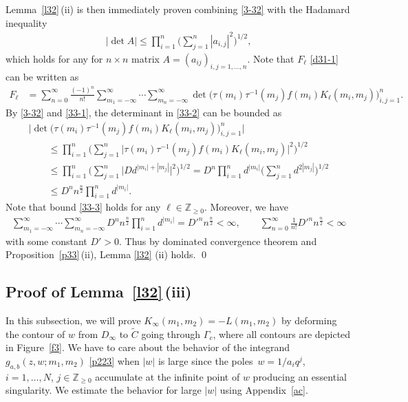 \documentclass[pdftex]{sigma}
\numberwithin{equation}{section}
\def\i{\infty}
\def\t{\tau}
\def\Z{\mathbb{Z}}
\begin{document}
 Lemma~\ref{l32}\,(ii) is then immediately proven
 combining \eqref{3-32} with
 the Hadamard inequality
\begin{align}
\label{33-1}
 |\det A|\le
 \prod_{i=1}^n\Bigg(\sum_{j=1}^n|a_{i,j}|^2\Bigg)^{1/2},
\end{align}
which holds for any for $n\times n$ matrix $A=(a_{ij})_{i,j=1,\dots,n}$.
 Note that $F_\ell$ \eqref{d31-1} can be written as
\begin{align}
 F_{\ell}
\label{33-2}
 &=\sum_{n=0}^{\i}\frac{(-1)^n}{n!}
 \sum_{m_1=-\i}^{\i}\cdots\sum_{m_n=-\i}^{\i}
 \det\big(\t(m_i)\t^{-1}(m_j)f(m_i)K_\ell (m_i,m_j)\big)_{i,j=1}^n.
\end{align}
 By \eqref{3-32} and \eqref{33-1},
 the determinant in \eqref{33-2} can be bounded as
\begin{gather}
 \big|\det\big(\t(m_i)\t^{-1}(m_j)f(m_i)K_\ell (m_i,m_j)\big)_{i,j=1}^n \big|
 \nonumber\\
 \qquad \le
 \prod_{i=1}^n\Bigg(\sum_{j=1}^n \big|\t(m_i)\t^{-1}(m_j)f(m_i)K_\ell (m_i,m_j)\big|^2
 \Bigg)^{1/2}
 \nonumber\\
 \qquad\le
 \prod_{i=1}^n\Bigg(\sum_{j=1}^n \big|Dd^{|m_i|+|m_j|}\big|^2
 \Bigg)^{1/2}
 =D^n \prod_{i=1}^n d^{|m_i|}\Bigg(\sum_{j=1}^n d^{2|m_j|}\Bigg)^{1/2}\nonumber\\
 \qquad \le D^n n^{\frac{n}{2}}\prod_{i=1}^n d^{|m_i|}.\label{33-3}
\end{gather}
 Note that bound \eqref{33-3} holds for any $\ell\in\Z_{\ge 0}$. Moreover, we have
\begin{gather*}
 \sum_{m_1=-\i}^{\i}\cdots\sum_{m_n=-\i}^{\i}
 D^n n^{\frac{n}{2}}\prod_{i=1}^n d^{|m_i|}
 =D'^n n^{\frac{n}{2}} <\i,
 \qquad \sum_{n=0}^{\i}\frac{1}{n!}D'^n n^{\frac{n}{2}}<\i
\end{gather*}
with some constant $D'>0$.
 Thus by dominated convergence theorem and Proposition~\ref{p33}\,(ii), Lemma \ref{l32}
 (ii) holds.
\qed



\subsection[Proof of Lemma 3.4 (iii)]{Proof of Lemma~\ref{l32}\,(iii)}
\label{s34}

 In this subsection, we will
 prove $K_{\i}(m_1,m_2)
 =-L(m_1,m_2)$ by deforming the contour of $w$
 from $D_{\infty}$ to $\tilde{C}$ going through
 $\Gamma_c$, where all contours are depicted in Figure~\ref{f3}. We have to care about the behavior of the integrand $g_{a,b}(z,w;m_1,m_2)$ \eqref{p223}
 when $|w|$ is large since the poles~${w=1/a_iq^j}$,~${i=1,\dots,N}$, $j\in\Z_{\ge 0}$ accumulate at the infinite point of $w$ producing an essential singularity.
 We estimate the behavior for large $|w|$ using Appendix~\ref{ac}.
\end{document}
